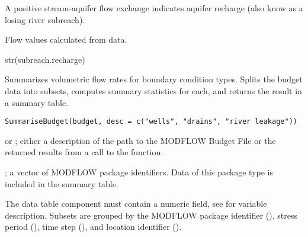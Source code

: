 \documentclass[a4paper]{book}
\begin{document}
%
\begin{Details}\relax
A positive stream-aquifer flow exchange indicates aquifer recharge (also know as a losing river subreach).
\end{Details}
%
\begin{Source}\relax
Flow values calculated from  data.
\end{Source}
%
\begin{Examples}
\begin{ExampleCode}
str(subreach.recharge)
\end{ExampleCode}
\end{Examples}
%
\begin{Description}\relax
Summarizes volumetric flow rates for boundary condition types.
Splits the budget data into subsets, computes summary statistics for each, and returns the result in a summary table.
\end{Description}
%
\begin{Usage}
\begin{verbatim}
SummariseBudget(budget, desc = c("wells", "drains", "river leakage"))
\end{verbatim}
\end{Usage}
%
\begin{Arguments}
\begin{ldescription}
\item[\code{budget}]  or ; either a description of the path to the MODFLOW Budget File or the returned results from a call to the  function.
\item[\code{desc}] ; a vector of MODFLOW package identifiers.
Data of this package type is included in the summary table.
\end{ldescription}
\end{Arguments}
%
\begin{Details}\relax
The  data table component must contain a numeric  field, see  for variable description.
Subsets are grouped by the MODFLOW package identifier (), stress period (), time step (), and location identifier ().
\end{Details}
%
\end{document}
